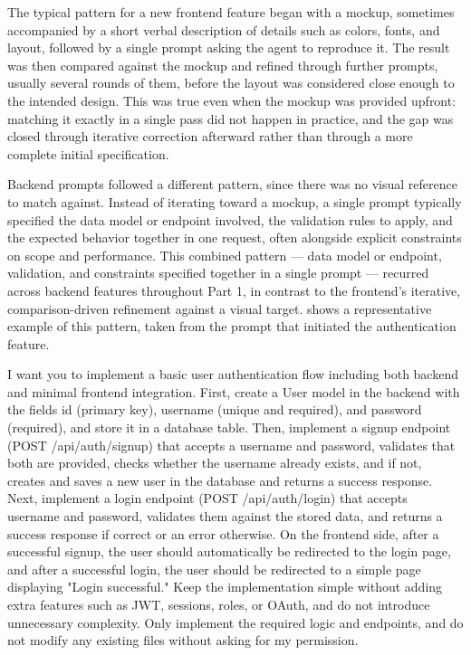 The typical pattern for a new frontend feature began with a mockup, sometimes accompanied by a short verbal description of details such as colors, fonts, and layout, followed by a single prompt asking the agent to reproduce it. The result was then compared against the mockup and refined through further prompts, usually several rounds of them, before the layout was considered close enough to the intended design. This was true even when the mockup was provided upfront: matching it exactly in a single pass did not happen in practice, and the gap was closed through iterative correction afterward rather than through a more complete initial specification.

Backend prompts followed a different pattern, since there was no visual reference to match against. Instead of iterating toward a mockup, a single prompt typically specified the data model or endpoint involved, the validation rules to apply, and the expected behavior together in one request, often alongside explicit constraints on scope and performance. This combined pattern --- data model or endpoint, validation, and constraints specified together in a single prompt --- recurred across backend features throughout Part 1, in contrast to the frontend's iterative, comparison-driven refinement against a visual target.  shows a representative example of this pattern, taken from the prompt that initiated the authentication feature.

\begin{listing}[H]
\begin{center}
\begin{promptbox}
I want you to implement a basic user authentication flow including both backend and minimal frontend integration. First, create a User model in the backend with the fields id (primary key), username (unique and required), and password (required), and store it in a database table. Then, implement a signup endpoint (POST /api/auth/signup) that accepts a username and password, validates that both are provided, checks whether the username already exists, and if not, creates and saves a new user in the database and returns a success response. Next, implement a login endpoint (POST /api/auth/login) that accepts username and password, validates them against the stored data, and returns a success response if correct or an error otherwise. On the frontend side, after a successful signup, the user should automatically be redirected to the login page, and after a successful login, the user should be redirected to a simple page displaying "Login successful." Keep the implementation simple without adding extra features such as JWT, sessions, roles, or OAuth, and do not introduce unnecessary complexity. Only implement the required logic and endpoints, and do not modify any existing files without asking for my permission.
\end{promptbox}
\end{center}
\caption{Example prompt used to initiate development of the authentication feature.}
\label{lst:auth-prompt}
\end{listing}

